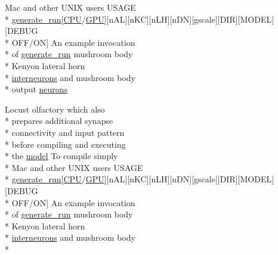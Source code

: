 \begin{DoxyCompactItemize}
Mac and other U\+N\+I\+X users U\+S\+A\+G\+E \\*
\hyperlink{userproject_2MBody__userdef__project_2README_8txt_a320a215d1e27b4de394be70e90d22863}{generate\+\_\+run}\mbox{[}\hyperlink{README_8txt_a74a069e3c75797de2636c4dd14daa147}{C\+P\+U}/\hyperlink{modelSpec_8h_a39cb9803524b6f3b783344b2f89867b4}{G\+P\+U}\mbox{]}\mbox{[}n\+A\+L\mbox{]}\mbox{[}n\+K\+C\mbox{]}\mbox{[}n\+L\+H\mbox{]}\mbox{[}n\+D\+N\mbox{]}\mbox{[}gscale\mbox{]}\mbox{[}D\+I\+R\mbox{]}\mbox{[}M\+O\+D\+E\+L\mbox{]}\mbox{[}D\+E\+B\+U\+G \\*
O\+F\+F/O\+N\mbox{]} An example invocation \\*
of \hyperlink{userproject_2MBody__userdef__project_2README_8txt_a320a215d1e27b4de394be70e90d22863}{generate\+\_\+run} mushroom body \\*
Kenyon lateral horn \\*
\hyperlink{userproject_2SynDelay__project_2README_8txt_adf6327d22e2c11a62a22ab5afd4f2b81}{interneurons} and mushroom body \\*
output \hyperlink{userproject_2MBody1__project_2README_8txt_a944a3d5062fd6de3a08a55d511a2fa8a}{neurons}
\item 
Locust olfactory which also \\*
prepares additional synapse \\*
connectivity and input pattern \\*
before compiling and executing \\*
the \hyperlink{README_8txt_a69fd801b7213948c12d9dd7eebb3ed14}{model} To compile simply \\*
Mac and other U\+N\+I\+X users U\+S\+A\+G\+E \\*
\hyperlink{userproject_2MBody__userdef__project_2README_8txt_a320a215d1e27b4de394be70e90d22863}{generate\+\_\+run}\mbox{[}\hyperlink{README_8txt_a74a069e3c75797de2636c4dd14daa147}{C\+P\+U}/\hyperlink{modelSpec_8h_a39cb9803524b6f3b783344b2f89867b4}{G\+P\+U}\mbox{]}\mbox{[}n\+A\+L\mbox{]}\mbox{[}n\+K\+C\mbox{]}\mbox{[}n\+L\+H\mbox{]}\mbox{[}n\+D\+N\mbox{]}\mbox{[}gscale\mbox{]}\mbox{[}D\+I\+R\mbox{]}\mbox{[}M\+O\+D\+E\+L\mbox{]}\mbox{[}D\+E\+B\+U\+G \\*
O\+F\+F/O\+N\mbox{]} An example invocation \\*
of \hyperlink{userproject_2MBody__userdef__project_2README_8txt_a320a215d1e27b4de394be70e90d22863}{generate\+\_\+run} mushroom body \\*
Kenyon lateral horn \\*
\hyperlink{userproject_2SynDelay__project_2README_8txt_adf6327d22e2c11a62a22ab5afd4f2b81}{interneurons} and mushroom body \\*

\end{DoxyCompactItemize}
